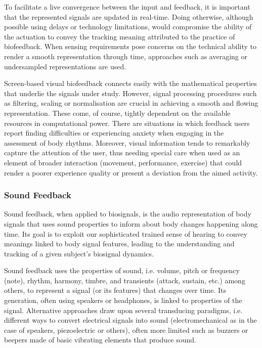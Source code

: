 To facilitate a live convergence between the input and feedback, it is important that the represented signals are updated in real-time. Doing otherwise, although possible using delays or technology limitations, would compromise the ability of the actuation to convey the tracking meaning attributed to the practice of biofeedback. When sensing requirements pose concerns on the technical ability to render a smooth representation through time, approaches such as averaging or undersampled representations are used.

Screen-based visual biofeedback connects easily with the mathematical properties that underlie the signals under study. However, signal processing procedures such as filtering, scaling or normalisation are crucial in achieving a smooth and flowing representation. These come, of course, tightly dependent on the available resources in computational power.
There are situations in which feedback users report finding difficulties or experiencing anxiety when engaging in the assessment of body rhythms. Moreover, visual information tends to remarkably capture the attention of the user, thus needing special care when used as an element of broader interaction (movement, performance, exercise) that could render a poorer experience quality or present a deviation from the aimed activity.

\subsubsection{Sound Feedback}

Sound feedback, when applied to biosignals, is the audio representation of body signals that uses sound properties to inform about body changes happening along time. Its goal is to exploit our sophisticated trained sense of hearing to convey meanings linked to body signal features, leading to the understanding and tracking of a given subject’s biosignal dynamics.

Sound feedback uses the properties of sound, i.e. volume, pitch or frequency (note), rhythm, harmony, timbre, and transients (attack, sustain, etc.) among others, to represent a signal (or its features) that changes over time. Its generation, often using speakers or headphones, is linked to properties of the signal. Alternative approaches draw upon several transducing paradigms, i.e. different ways to convert electrical signals into sound (electromechanical as in the case of speakers, piezoelectric or others), often more limited such as buzzers or beepers made of basic vibrating elements that produce sound.

